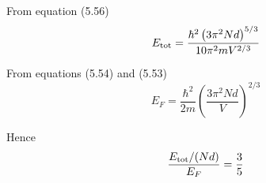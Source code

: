 


From equation (5.56)
\begin{equation*}
E_{\rm tot}=\frac{\hbar^2\left(3\pi^2Nd\right)^{5/3}}{10\pi^2mV^{2/3}}
\end{equation*}

From equations (5.54) and (5.53)
\begin{equation*}
E_F=\frac{\hbar^2}{2m}\left(\frac{3\pi^2Nd}{V}\right)^{2/3}
\end{equation*}

Hence
\begin{equation*}
\frac{E_{\rm tot}/(Nd)}{E_F}=\frac{3}{5}
\end{equation*}


